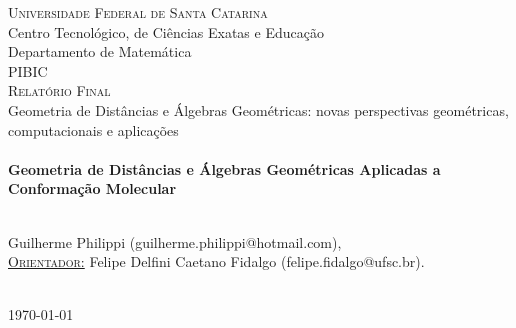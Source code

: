 \documentclass[a4paper,12pt]{report}
\theoremstyle{plain}
\theoremstyle{definition}
\begin{document}
\begin{titlepage}
		\textsc{\LARGE \hspace{-0.17cm}Universidade Federal de Santa Catarina}\\[0.5cm] %
		{\Large Centro Tecnológico, de Ciências Exatas e Educação\\ Departamento de Matemática}\\[1.5cm] %
		\textsc{\Large PIBIC \\ Relatório Final \vspace{1.5cm}  \\ }{\large Geometria de Distâncias e Álgebras Geométricas: novas perspectivas geométricas, computacionais e aplicações}\\[2.0cm] %
		
		
		
		\HRule \\[0.4cm]
		{ \LARGE \bfseries \textbf{Geometria de Distâncias e Álgebras Geométricas Aplicadas a Conformação Molecular}} \\ [0.4cm] %
		\HRule \\[2cm]
		
		
		\begin{minipage}{1\textwidth}
			\begin{center} \large
				Guilherme Philippi (guilherme.philippi@hotmail.com),
				\vspace{0.5cm}
				\\
				\underline{\textsc{Orientador:}} \vspace{0.2cm}
				Felipe Delfini Caetano Fidalgo (felipe.fidalgo@ufsc.br).
			\end{center}
		\end{minipage} \\[2cm]
		
		
		{\large \today} %
		
		
		\vfill %
		
	\end{titlepage}
	
\end{document}
